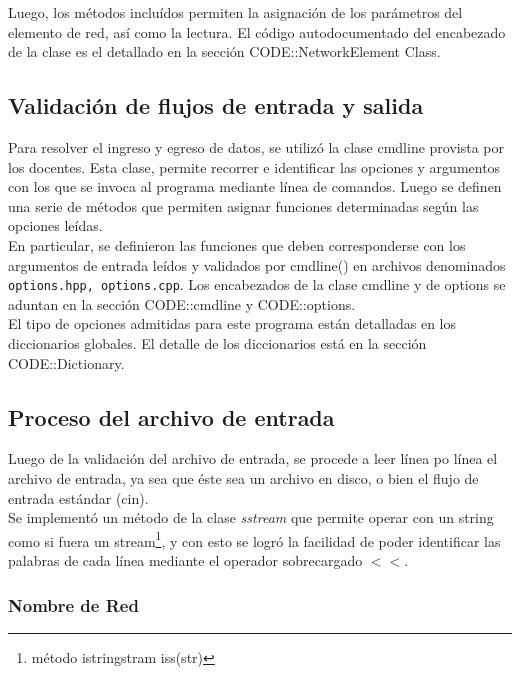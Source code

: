 \documentclass[10pt,a4paper]{article}
\begin{document}
Luego, los métodos incluídos permiten la asignación de los parámetros del elemento de red, así como la lectura. El código autodocumentado del encabezado de la clase es el detallado en la sección CODE::NetworkElement Class.\\


\subsection{Validación de flujos de entrada y salida}

Para resolver el ingreso y egreso de datos, se utilizó la clase cmdline provista por los docentes.
Esta clase, permite recorrer e identificar las opciones y argumentos con los que se invoca al programa mediante línea de comandos. Luego se definen una serie de métodos que permiten asignar funciones determinadas según las opciones leídas.\\
En particular, se definieron las funciones que deben corresponderse con los argumentos de entrada leídos y validados por cmdline() en archivos denominados \texttt{options.hpp, options.cpp}. Los encabezados de la clase cmdline y de options se aduntan en la sección CODE::cmdline y CODE::options.\\

El tipo de opciones admitidas para este programa están detalladas en los diccionarios globales. El detalle de los diccionarios está en la sección CODE::Dictionary.\\


\subsection{Proceso del archivo de entrada}

Luego de la validación del archivo de entrada, se procede a leer línea po línea el archivo de entrada, ya sea que éste sea un archivo en disco, o bien el flujo de entrada estándar (cin).\\

Se implementó un método de la clase \textit{sstream} que permite operar con un string como si fuera un stream\footnote{método istringstram iss(str)}, y con esto se logró la facilidad de poder identificar las palabras de cada línea mediante el operador sobrecargado $<<$.

\subsubsection{Nombre de Red}
\end{document}
